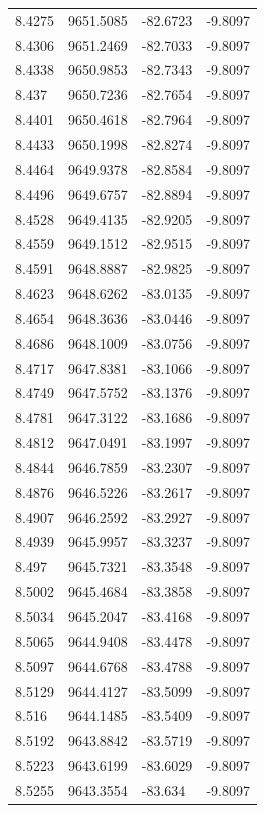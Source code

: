 \begin{table}[H]
\begin{tabular}{llll}
8.4275 & 9651.5085 & -82.6723 & -9.8097 \\
8.4306 & 9651.2469 & -82.7033 & -9.8097 \\
8.4338 & 9650.9853 & -82.7343 & -9.8097 \\
8.437 & 9650.7236 & -82.7654 & -9.8097 \\
8.4401 & 9650.4618 & -82.7964 & -9.8097 \\
8.4433 & 9650.1998 & -82.8274 & -9.8097 \\
8.4464 & 9649.9378 & -82.8584 & -9.8097 \\
8.4496 & 9649.6757 & -82.8894 & -9.8097 \\
8.4528 & 9649.4135 & -82.9205 & -9.8097 \\
8.4559 & 9649.1512 & -82.9515 & -9.8097 \\
8.4591 & 9648.8887 & -82.9825 & -9.8097 \\
8.4623 & 9648.6262 & -83.0135 & -9.8097 \\
8.4654 & 9648.3636 & -83.0446 & -9.8097 \\
8.4686 & 9648.1009 & -83.0756 & -9.8097 \\
8.4717 & 9647.8381 & -83.1066 & -9.8097 \\
8.4749 & 9647.5752 & -83.1376 & -9.8097 \\
8.4781 & 9647.3122 & -83.1686 & -9.8097 \\
8.4812 & 9647.0491 & -83.1997 & -9.8097 \\
8.4844 & 9646.7859 & -83.2307 & -9.8097 \\
8.4876 & 9646.5226 & -83.2617 & -9.8097 \\
8.4907 & 9646.2592 & -83.2927 & -9.8097 \\
8.4939 & 9645.9957 & -83.3237 & -9.8097 \\
8.497 & 9645.7321 & -83.3548 & -9.8097 \\
8.5002 & 9645.4684 & -83.3858 & -9.8097 \\
8.5034 & 9645.2047 & -83.4168 & -9.8097 \\
8.5065 & 9644.9408 & -83.4478 & -9.8097 \\
8.5097 & 9644.6768 & -83.4788 & -9.8097 \\
8.5129 & 9644.4127 & -83.5099 & -9.8097 \\
8.516 & 9644.1485 & -83.5409 & -9.8097 \\
8.5192 & 9643.8842 & -83.5719 & -9.8097 \\
8.5223 & 9643.6199 & -83.6029 & -9.8097 \\
8.5255 & 9643.3554 & -83.634 & -9.8097 \\

\end{tabular}
\end{table}
